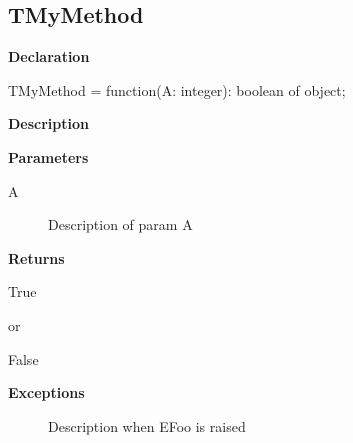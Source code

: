 \documentclass{report}
\newif\ifpdf
\begin{document}
\subsection*{TMyMethod}
\fi
\label{ok_param_raises_returns_proctype-TMyMethod}
\begin{list}{}{
\setlength{\itemindent}{0cm}
\setlength{\listparindent}{0cm}
\setlength{\leftmargin}{\evensidemargin}
\addtolength{\leftmargin}{\tmplength}
\settowidth{\labelsep}{X}
\addtolength{\leftmargin}{\labelsep}
\setlength{\labelwidth}{\tmplength}
}
\item[\textbf{Declaration}\hfill]
\ifpdf
\begin{flushleft}
\fi
\begin{ttfamily}
TMyMethod = function(A: integer): boolean of object;\end{ttfamily}

\ifpdf
\end{flushleft}
\fi

\par
\item[\textbf{Description}]
  \par
\item[\textbf{Parameters}]
\begin{description}
\item[A] Description of param A
\end{description}
\item[\textbf{Returns}]\begin{ttfamily}True\end{ttfamily} or \begin{ttfamily}False\end{ttfamily}
\item[\textbf{Exceptions}]
\begin{description}
\item[\begin{ttfamily}EFoo\end{ttfamily}(\ref{ok_param_raises_returns_proctype.EFoo})] Description when EFoo is raised
\end{description}


\end{list}
\end{document}
